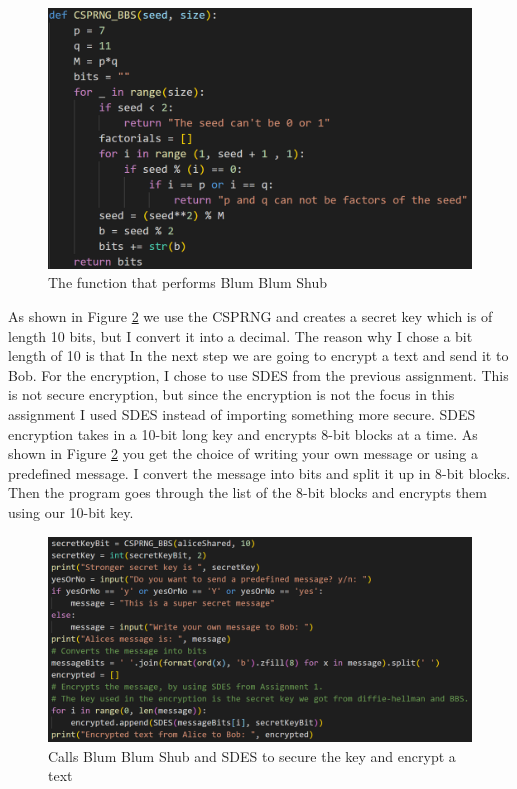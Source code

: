 \documentclass[12pt, letterpaper]{article}
\begin{document}
\begin{figure}[H]
  \includegraphics[width=\linewidth]{code_snippets/step5.PNG}
  \caption{The function that performs Blum Blum Shub}
  \label{fig:step5}
\end{figure}

As shown in Figure \ref{fig:step6} we use the CSPRNG and creates a secret key which is of length 10 bits, but I convert it into a decimal. The reason why I chose a bit length of 10 is that In the next step we are going to encrypt a text and send it to Bob. For the encryption, I chose to use SDES from the previous assignment. This is not secure encryption, but since the encryption is not the focus in this assignment I used SDES instead of importing something more secure. SDES encryption takes in a 10-bit long key and encrypts 8-bit blocks at a time. As shown in Figure \ref{fig:step6} you get the choice of writing your own message or using a predefined message. I convert the message into bits and split it up in 8-bit blocks. Then the program goes through the list of the 8-bit blocks and encrypts them using our 10-bit key.

\begin{figure}[H]
  \includegraphics[width=\linewidth]{code_snippets/step6.PNG}
  \caption{Calls Blum Blum Shub and SDES to secure the key and encrypt a text}
  \label{fig:step6}
\end{figure}
\end{document}
